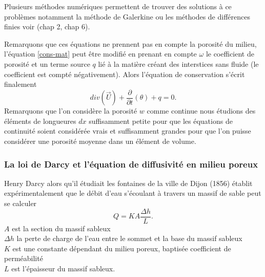 \documentclass[a4paper,10pt]{article}
\begin{document}
	Plusieurs méthodes numériques permettent de trouver des solutions à ce problèmes notamment la méthode de Galerkine ou les méthodes de différences finies voir \cite{allaire2005analyse} (chap 2, chap 6). 
	
	\vspace{7mm}
	Remarquons que ces équations ne prennent pas en compte la porosité du milieu, l'équation \eqref{cons-mat} peut être modifié en prenant en compte $\omega$ le coefficient de porosité et un terme source $q$ lié à la matière créant des interstices sans fluide (le coefficient est compté négativement). Alors l'équation de conservation s'écrit finalement
	\begin{equation}
		\label{eq-mass-por}
		div(\overrightarrow{U})+\frac{\partial}{\partial t}(\theta)+ q=0.
	\end{equation}
	Remarquons que l'on considère la porosité $w$ comme continue nous étudions des éléments de longueures $dx$ suffisamment petite pour que les équations de continuité soient considérée vrais et suffisamment grandes pour que l'on puisse considérer une porosité moyenne dans un élément de volume.
	
	\subsubsection{La loi de Darcy et l'équation de diffusivité en milieu poreux}
	\label{Darcy}
	Henry Darcy alors qu'il étudiait les fontaines de la ville de Dijon (1856) établit expérimentalement que le débit d'eau s'écoulant à travers un massif de sable peut se calculer
	\begin{equation}
		Q=KA\frac{\Delta h}{L}.
	\end{equation}
	$A$ est la section du massif sableux\\
	$\Delta h$ la perte de charge de l'eau entre le sommet et la base du massif sableux\\
	$K$ est une constante dépendant du milieu poreux, baptisée coefficient de perméabilité\\
	$L$ est l'épaisseur du massif sableux.
	
\end{document}
